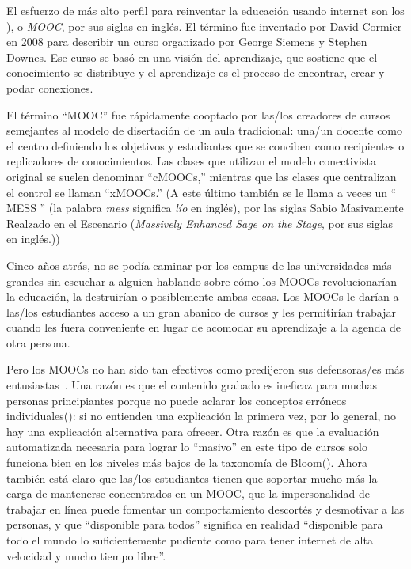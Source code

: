 
El esfuerzo de más alto perfil para reinventar la educación usando internet
son los ), o \emph{MOOC}, por sus siglas en inglés.
El término fue inventado por David Cormier en 2008
para describir un curso organizado por George Siemens
y Stephen Downes.
Ese curso se basó en una visión  del aprendizaje,
que sostiene que el conocimiento se distribuye
y el aprendizaje es el proceso de encontrar, crear y podar conexiones.

El término ``MOOC'' fue rápidamente cooptado por las/los creadores de
cursos semejantes al modelo de disertación de un aula tradicional:
una/un docente como el centro definiendo los objetivos
y estudiantes que se conciben como recipientes o replicadores de conocimientos.
Las clases que utilizan el modelo conectivista original se suelen denominar ``cMOOCs,''
mientras que las clases que centralizan el control se llaman ``xMOOCs.''
(A este último también se le llama a veces un `` MESS '' (la palabra \emph{mess} significa \emph{lío} en inglés),
por las siglas Sabio Masivamente Realzado en el Escenario (\emph{Massively Enhanced Sage on the Stage}, por sus siglas en inglés.))

Cinco años atrás,
no se podía caminar por los campus de las universidades más grandes
sin escuchar a alguien hablando sobre cómo los MOOCs revolucionarían la educación,
la destruirían
o posiblemente ambas cosas.
Los MOOCs le darían a las/los estudiantes acceso a un gran abanico de cursos
y les permitirían trabajar cuando les fuera conveniente
en lugar de acomodar su aprendizaje a la agenda de otra persona.

Pero los MOOCs no han sido tan efectivos
como predijeron sus defensoras/es más entusiastas~\cite{Ubel2017}.
Una razón es que
el contenido grabado es ineficaz para muchas personas principiantes
porque no puede aclarar los conceptos erróneos individuales():
si no entienden una explicación la primera vez,
por lo general, no hay una explicación alternativa para ofrecer.
Otra razón es que la evaluación automatizada necesaria para lograr lo ``masivo'' en este tipo de cursos
solo funciona bien en los niveles más bajos de la taxonomía de Bloom().
Ahora también está claro que
las/los estudiantes tienen que soportar mucho más la carga de mantenerse concentrados en un MOOC,
que la impersonalidad de trabajar en línea puede fomentar un comportamiento descortés y desmotivar a las personas,
y que ``disponible para todos'' significa en realidad
``disponible para todo el mundo lo suficientemente pudiente como para tener internet de alta velocidad y mucho tiempo libre''.

